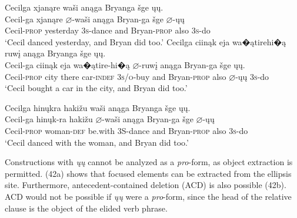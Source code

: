 \documentclass[output=paper]{LSP/langsci}
\begin{document}
\begin{exe}
\ex
\begin{xlist}
\ex 
\glll Cecilga 			xjan\k{a}re		wa\v{s}i an\k{a}ga	Bryanga			\v{s}ge  	\k{u}\k{u}.\\
Cecil-ga			xjan\k{a}re		$\varnothing$-wa\v{s}i		an\k{a}ga	Bryan-ga			\v{s}ge		$\varnothing$-\k{u}\k{u} \\
	Cecil-\textsc{prop}		yesterday	\textsc{3s}-dance	and			Bryan-\textsc{prop}	also	\textsc{3s}-do \\
\trans `Cecil danced yesterday, and Bryan did too.'
\ex 
\glll Cecilga 			ciin\k{a}k	eja		wa�\k{a}tirehi�\k{a}		ruw\k{i}	an\k{a}ga	Bryanga			\v{s}ge  \k{u}\k{u}. \\
Cecil-ga			ciin\k{a}k	eja		wa�\k{a}tire-hi�\k{a}	$\varnothing$-ruw\k{i}			an\k{a}ga	Bryan-ga	\v{s}ge \k{u}\k{u}. \\
Cecil-\textsc{prop}	city there	car-\textsc{indef}	\textsc{3s/o}-buy and Bryan-\textsc{prop}	also $\varnothing$-\k{u}\k{u} \textsc{3s}-do \\
\trans `Cecil bought a car in the city, and Bryan did too.'

\ex 
\glll Cecilga 		hin\k{u}kra	haki\v{z}u		wa\v{s}i		an\k{a}ga	Bryanga			\v{s}ge		\k{u}\k{u}.\\
Cecil-ga		hin\k{u}k-ra	haki\v{z}u		$\varnothing$-wa\v{s}i		an\k{a}ga	Bryan-ga	\v{s}ge		$\varnothing$-\k{u}\k{u} \\	Cecil-\textsc{prop}		woman-\textsc{def} 	be.with		3S-dance	and			Bryan-\textsc{prop}	also	\textsc{3s}-do \\
\trans `Cecil danced with the woman, and Bryan did too.'
\end{xlist}
\end{exe}

Constructions with \textit{\k{u}\k{u}} cannot be analyzed as a \textit{pro}-form, as object extraction is permitted. (42a) shows that focused elements can be extracted from the ellipsis site. Furthermore, antecedent-contained deletion (ACD) is also possible (42b). ACD would not be possible if \textit{\k{u}\k{u}} were a \textit{pro}-form, since the head of the relative clause is the object of the elided verb phrase.
\end{document}
